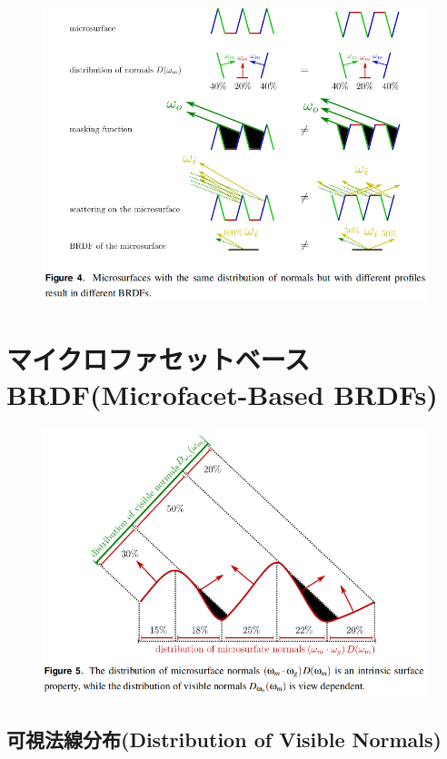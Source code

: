 \documentclass[a4paper,xelatex,ja=standard]{bxjsarticle}
\begin{document}
\begin{figure}
    \includegraphics[width=\textwidth]{Figure4.png}
    \caption{}
    \label{fig:4}
\end{figure}

\section{マイクロファセットベースBRDF(Microfacet-Based BRDFs)}

\begin{figure}
    \includegraphics[width=\textwidth]{Figure5.png}
    \caption{}
    \label{fig:5}
\end{figure}

\subsection{可視法線分布(Distribution of Visible Normals)}
\end{document}
